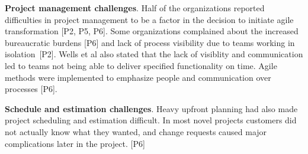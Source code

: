 {\bfseries Project management challenges}. Half of the organizations reported
difficulties in project management to be a factor in the decision to initiate
agile transformation [P2, P5, P6]. Some organizations complained about the
increased bureaucratic burdens [P6] and lack of process visibility due to teams
working in isolation [P2]. Wells et al also stated that the lack of visiblity
and communication led to teams not being able to deliver specified functionality
on time. Agile methods were implemented to emphasize people and communication
over processes [P6].

{\bfseries Schedule and estimation challenges}. Heavy upfront planning had also
made project scheduling and estimation difficult. In most novel projects
customers did not actually know what they wanted, and change requests caused
major complications later in the project. [P6]
